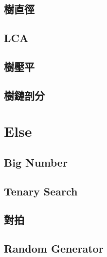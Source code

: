 \subsection{樹直徑}

\subsection{LCA}

\subsection{樹壓平}

\subsection{樹鏈剖分}


\section{Else}
\subsection{Big Number}

\subsection{Tenary Search}

\subsection{對拍}

\subsection{Random Generator}

